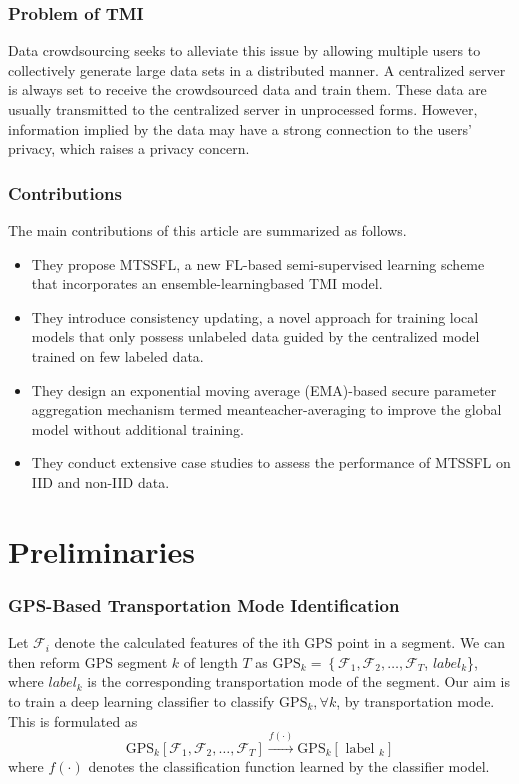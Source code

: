 \documentclass[UTF8]{beamer}
\begin{document}
\begin{frame}
\frametitle{Problem of TMI}
Data crowdsourcing seeks to alleviate this issue by allowing multiple users to collectively generate large data sets in a distributed manner. A centralized server is always set to receive the crowdsourced data and train them. These data are usually transmitted to the centralized server in unprocessed forms. \alert{However, information implied by the data may have a strong connection to the users’ privacy, which raises a privacy concern.}

\end{frame}

\begin{frame}
\frametitle{Contributions}
The main contributions of this article are summarized as follows.

\begin{itemize}
 \item They propose MTSSFL, a new FL-based semi-supervised learning scheme that incorporates an ensemble-learningbased TMI model.
 \item They introduce consistency updating, a novel approach for training local models that only possess unlabeled data guided by the centralized model trained on few labeled data.
 \item They design an exponential moving average (EMA)-based secure parameter aggregation mechanism termed meanteacher-averaging to improve the global model without additional training.
 \item They conduct extensive case studies to assess the performance of MTSSFL on IID and non-IID data. 
\end{itemize}

\end{frame}


\section{Preliminaries}
\begin{frame}
\frametitle{GPS-Based Transportation Mode Identification}

\begin{definition}
Let $\mathcal{F}_i$ denote the calculated features of the ith GPS point in a segment. We can then reform GPS segment $k$ of length $T$ as $\mathrm{GPS}_k=\left\{\mathcal{F}_1, \mathcal{F}_2, \ldots, \mathcal{F}_T\right.$, ${label}_{k}$\}, where ${label}_{k}$ is the corresponding transportation mode of the segment. Our aim is to train a deep learning classifier to classify $\mathrm{GPS}_k, \forall k$, by transportation mode. This is formulated as
$$
\mathrm{GPS}_k\left[\mathcal{F}_1, \mathcal{F}_2, \ldots, \mathcal{F}_T\right] \stackrel{f(\cdot)}{\longrightarrow} \mathrm{GPS}_k\left[\text { label }_k\right]
$$
where $f(\cdot)$ denotes the classification function learned by the classifier model.
\end{definition}
\end{frame}
\end{document}
